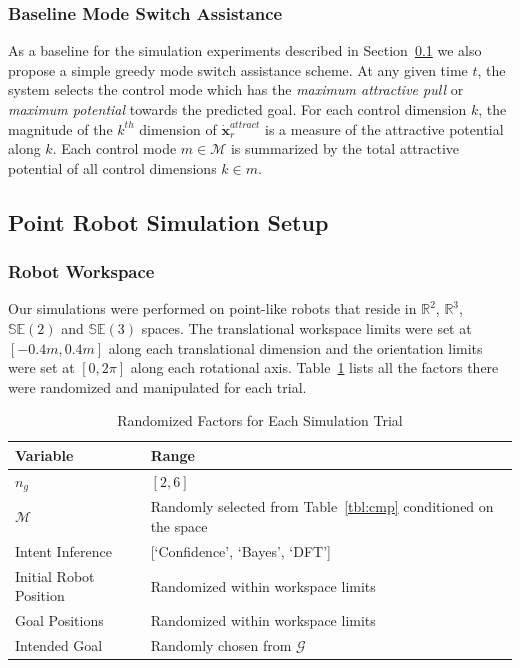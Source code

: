 \documentclass[conference]{IEEEtran}
\begin{document}
\subsubsection{Baseline Mode Switch Assistance}\label{sssec:baseline}
As a baseline for the simulation experiments described in Section~\ref{ssec:sim} we also propose a simple greedy mode switch assistance scheme. At any given time $t$, the system selects the control mode which has the \textit{maximum attractive pull} or \textit{maximum potential} towards the predicted goal. For each control dimension $k$, the magnitude of the $k^{th}$ dimension of $\dot{\boldsymbol{x}}_r^{attract}$ is a measure of the attractive potential along $k$. Each control mode $m \in \mathcal{M}$ is summarized by the total attractive potential of all control dimensions $k \in m$.

\subsection{Point Robot Simulation Setup}\label{ssec:sim}
\subsubsection{Robot Workspace}
Our simulations were performed on point-like robots that reside in $\mathbb{R}^2$, $\mathbb{R}^3$, $\mathbb{SE}(2)$ and $\mathbb{SE}(3)$ spaces. The translational workspace limits were set at $[-0.4m, 0.4m]$ along each translational dimension and the orientation limits were set at $[0, 2\pi]$ along each rotational axis. Table~\ref{tbl:manip} lists all the factors there were randomized and manipulated for each trial. 
\begin{table}[t]
	\centering
	\begin{tabular}{|p{3cm}|p{3cm}|}
		\hline
		\textbf{Variable} &\textbf{Range}  \\ \hline
		$n_g$ &  $[2,6]$ \\ \hline
		$\mathcal{M}$ & Randomly selected from Table~\ref{tbl:cmp} conditioned on the space\\ \hline
		Intent Inference & [`Confidence', `Bayes', `DFT'] \\ \hline
		Initial Robot Position & Randomized within workspace limits \\ \hline
		Goal Positions & Randomized within workspace limits \\ \hline
		Intended Goal & Randomly chosen from $\mathcal{G}$ \\ \hline
	\end{tabular}
	\vspace{.2cm}
	\caption{Randomized Factors for Each Simulation Trial} 
	\label{tbl:manip}
	\vspace{-.5cm}
\end{table}
\end{document}
